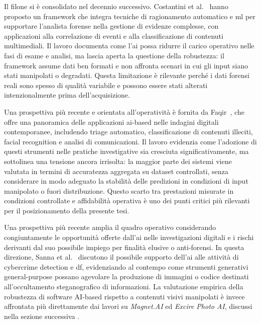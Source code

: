 Il filone si è consolidato nel decennio successivo. Costantini et al.~\cite{costantini2019digital} hanno proposto un framework che integra tecniche di ragionamento automatico e \gls{ml} per supportare l'analista forense nella gestione di evidenze complesse, con applicazioni alla correlazione di eventi e alla classificazione di contenuti multimediali. Il lavoro documenta come l'\gls{ai} possa ridurre il carico operativo nelle fasi di esame e analisi, ma lascia aperta la questione della robustezza: il framework assume dati ben formati e non affronta scenari in cui gli input siano stati manipolati o degradati. Questa limitazione è rilevante perché i dati forensi reali sono spesso di qualità variabile e possono essere stati alterati intenzionalmente prima dell'acquisizione.

Una prospettiva più recente e orientata all'operatività è fornita da Faqir~\cite{faqir2023digital}, che offre una panoramica delle applicazioni \gls{ai}-based nelle indagini digitali contemporanee, includendo triage automatico, classificazione di contenuti illeciti, facial recognition e analisi di comunicazioni. Il lavoro evidenzia come l'adozione di questi strumenti nelle pratiche investigative sia cresciuta significativamente, ma sottolinea una tensione ancora irrisolta: la maggior parte dei sistemi viene valutata in termini di accuratezza aggregata su dataset controllati, senza considerare in modo adeguato la stabilità delle predizioni in condizioni di input manipolato o fuori distribuzione. Questo scarto tra prestazioni misurate in condizioni controllate e affidabilità operativa è uno dei punti critici più rilevanti per il posizionamento della presente tesi.

Una prospettiva più recente amplia il quadro operativo considerando congiuntamente le opportunità offerte dall'\gls{ai} nelle investigazioni digitali e i rischi derivanti dal suo possibile impiego per finalità elusive o anti-forensi. In questa direzione, Sanna et al.~\cite{sanna2025cybercrime} discutono il possibile supporto dell'\gls{ai} alle attività di cybercrime detection e \gls{df}, evidenziando al contempo come strumenti generativi general-purpose possano agevolare la produzione di immagini o codice destinati all'occultamento steganografico di informazioni. La valutazione empirica della robustezza di software AI-based rispetto a contenuti visivi manipolati è invece affrontata più direttamente dai lavori su \textit{Magnet.AI} ed \textit{Excire Photo AI}, discussi nella sezione successiva \cite{sanna2024preliminary,sanna2025pixelperfect}.

